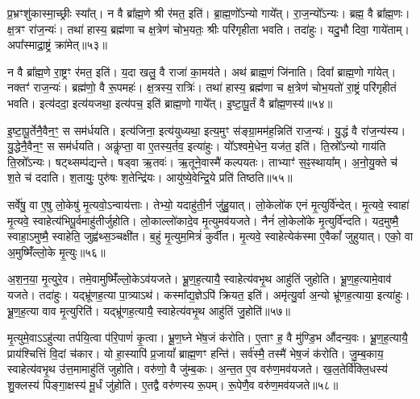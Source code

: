 प्र॒भ्रꣳशु॑कास्मा॒च्छ्रीः स्या᳚त्।
न वै ब्रा᳚ह्म॒णे श्री र॑मत॒ इति॑।
ब्रा॒ह्म॒णो᳚\-ऽन्यो गाये᳚त्।
रा॒ज॒न्यो᳚\-ऽन्यः।
ब्रह्म॒ वै ब्रा᳚ह्म॒णः।
क्ष॒त्रꣳ रा॑ज॒न्यः॑।
तथा॑ हास्य॒ ब्रह्म॑णा च क्ष॒त्रेण॑ चोभ॒यतः॒ श्रीः परि॑गृहीता भवति।
तदा॑हुः।
यदु॒भौ दिवा॒ गाये॑ताम्।
अपा᳚स्माद्रा॒ष्ट्रं क्रा॑मेत्॥५३॥\ip

न वै ब्रा᳚ह्म॒णे रा॒ष्ट्रꣳ र॑मत॒ इति॑।
य॒दा खलु॒ वै राजा॑ का॒मय॑ते।
अथ॑ ब्राह्म॒णं जि॑नाति।
दिवा᳚ ब्राह्म॒णो गा॑येत्।
नक्तꣳ॑ राज॒न्यः॑।
ब्रह्म॑णो॒ वै रू॒पमहः॑।
क्ष॒त्रस्य॒ रात्रिः॑।
तथा॑ हास्य॒ ब्रह्म॑णा च क्ष॒त्रेण॑ चोभ॒यतो॑ रा॒ष्ट्रं परि॑गृहीतं भवति।
इत्य॑ददा॒ इत्य॑यजथा॒ इत्य॑पच॒ इति॑ ब्राह्म॒णो गाये᳚त्।
इ॒ष्टा॒पू॒र्तं वै ब्रा᳚ह्म॒णस्य॑॥५४॥\ip

इ॒ष्टा॒पू॒र्तेनै॒वैन॒ꣳ॒ स सम॑र्धयति।
इत्य॑जिना॒ इत्य॑युध्यथा॒ इत्य॒मुꣳ स॑ङ्ग्रा॒मम॑ह॒न्निति॑ राज॒न्यः॑।
यु॒द्धं वै रा॑ज॒न्य॑स्य।
यु॒द्धेनै॒वैन॒ꣳ॒ स सम॑र्धयति।
अकॢ॑प्ता॒ वा ए॒तस्य॒र्तव॒ इत्या॑हुः।
यो᳚ऽश्वमे॒धेन॒ यज॑त॒ इति॑।
ति॒स्रो᳚\-ऽन्यो गाय॑ति ति॒स्रो᳚\-ऽन्यः।
षट्थ्सम्प॑द्यन्ते।
षड्वा ऋ॒तवः॑।
ऋ॒तूने॒वास्मै॑ कल्पयतः।
ताभ्याꣳ॑ स॒ꣴ॒स्थाया᳚म्।
अ॒नो॒यु॒क्ते च॑ श॒ते च॑ ददाति।
श॒तायुः॒ पुरु॑षः श॒तेन्द्रि॑यः।
आयु॑ष्ये॒वेन्द्रि॒ये प्रति॑ तिष्ठति॥५५॥\ip\anuvakamend[गाये॑ताङ्क्रामेद्ब्राह्म॒णस्य॑ कल्पयतश्च॒त्वारि॑ च]

सर्वे॑षु॒ वा ए॒षु लो॒केषु॑ मृ॒त्यवो॒\-ऽन्वाय॑त्ताः।
तेभ्यो॒ यदाहु॑ती॒र्न जु॑हु॒यात्।
लो॒केलो॑क एनं मृ॒त्युर्वि॑न्देत्।
मृ॒त्यवे॒ स्वाहा॑ मृ॒त्यवे॒ स्वाहेत्य॑भिपू॒र्वमाहु॑तीर्जुहोति।
लो॒काल्लो॑कादे॒व मृ॒त्युमव॑यजते।
नैनं॑ लो॒केलो॑के मृ॒त्युर्वि॑न्दति।
यद॒मुष्मै॒ स्वाहा॒\-ऽमुष्मै॒ स्वाहेति॒ जुह्व॑थ्स॒ञ्चक्षी॑त।
ब॒हुं मृ॒त्युम॒मित्रं॑ कुर्वीत।
मृ॒त्यवे॒ स्वाहेत्येक॑स्मा ए॒वैकां᳚ जुहुयात्।
एको॒ वा अ॒मुष्मिँ॑ल्लो॒के मृ॒त्युः॥५६॥\ip

अ॒श॒न॒या॒ मृ॒त्युरे॒व।
तमे॒वामुष्मिँ॑ल्लो॒के\-ऽव॑यजते।
भ्रू॒ण॒ह॒त्यायै॒ स्वाहेत्य॑वभृ॒थ आहु॑तिं जुहोति।
भ्रू॒ण॒ह॒त्यामे॒वाव॑ यजते।
तदा॑हुः।
यद्भ्रू॑णह॒त्या पा॒त्र्याऽथ॑।
कस्मा᳚द्य॒ज्ञेऽपि॑ क्रियत॒ इति॑।
अमृ॑त्यु॒र्वा अ॒न्यो भ्रू॑णह॒त्याया॒ इत्या॑हुः।
भ्रू॒ण॒ह॒त्या वाव मृ॒त्युरिति॑।
यद्भ्रू॑णह॒त्यायै॒ स्वाहेत्य॑वभृ॒थ आहु॑तिं जु॒होति॑॥५७॥\ip

मृ॒त्युमे॒वाऽऽहु॑त्या तर्पयि॒त्वा प॑रि॒पाणं॑ कृ॒त्वा।
भ्रू॒ण॒घ्ने भे॑ष॒जं क॑रोति।
ए॒ताꣳ ह॒ वै मु॑ण्डि॒भ औ॑दन्य॒वः।
भ्रू॒ण॒ह॒त्यायै॒ प्राय॑श्चित्तिं वि॒दां च॑कार।
यो हा॒स्यापि॑ प्र॒जायां᳚ ब्राह्म॒णꣳ हन्ति॑।
सर्व॑स्मै॒ तस्मै॑ भेष॒जं क॑रोति।
जु॒म्ब॒काय॒ स्वाहेत्य॑वभृ॒थ उ॑त्त॒मामाहु॑तिं जुहोति।
वरु॑णो॒ वै जु॑म्ब॒कः।
अ॒न्त॒त ए॒व वरु॑ण॒मव॑यजते।
ख॒ल॒तेर्वि॑क्लि॒धस्य॑ शु॒क्लस्य॑ पिङ्गा॒क्षस्य॑ मू॒र्धं जु॑होति।
ए॒तद्वै वरु॑णस्य रू॒पम्।
रू॒पेणै॒व वरु॑ण॒मव॑यजते॥५८॥\ip\anuvakamend[लो॒के मृ॒त्युर्जु॒होति॑ मू॒र्धं जु॑होति॒ द्वे च॑]

